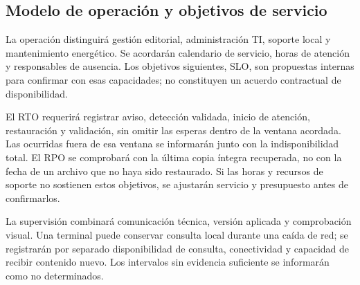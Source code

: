 \subsection{Modelo de operación y objetivos de servicio}
La operación distinguirá gestión editorial, administración TI, soporte local y mantenimiento energético. Se acordarán calendario de servicio, horas de atención y responsables de ausencia. Los objetivos siguientes, SLO, son propuestas internas para confirmar con esas capacidades; no constituyen un acuerdo contractual de disponibilidad.


El RTO requerirá registrar aviso, detección validada, inicio de atención, restauración y validación, sin omitir las esperas dentro de la ventana acordada. Las ocurridas fuera de esa ventana se informarán junto con la indisponibilidad total. El RPO se comprobará con la última copia íntegra recuperada, no con la fecha de un archivo que no haya sido restaurado. Si las horas y recursos de soporte no sostienen estos objetivos, se ajustarán servicio y presupuesto antes de confirmarlos.

La supervisión combinará comunicación técnica, versión aplicada y comprobación visual. Una terminal puede conservar consulta local durante una caída de red; se registrarán por separado disponibilidad de consulta, conectividad y capacidad de recibir contenido nuevo. Los intervalos sin evidencia suficiente se informarán como no determinados.

